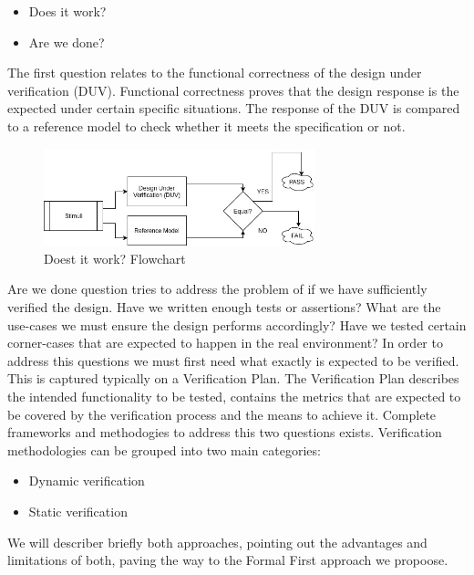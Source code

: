 \documentclass[a4paper,11pt]{article}
\begin{document}
\begin{itemize}
\item Does it work?
\item Are we done?
\end{itemize}
The first question relates to the functional correctness of the design under verification (DUV). Functional correctness proves that the design response is the expected under certain specific situations. The response of the DUV is compared to a reference model to check whether it meets the specification or not. 
\begin{figure}[h]
\centering
\includegraphics[width=0.7\textwidth]{doesitwork.jpg}
\caption{Doest it work? Flowchart}
\end{figure} 
Are we done question tries to address the problem of if we have sufficiently verified the design. Have we written enough tests or assertions? What are the use-cases we must ensure the design performs accordingly? Have we tested certain corner-cases that are expected to happen in the real environment? In order to address this questions we must first need what exactly is expected to be verified. 
This is captured typically on a Verification Plan. The Verification Plan describes the intended functionality to be tested, contains the metrics that are expected to be covered by the verification process and the means to achieve it. 
Complete frameworks and methodogies to address this two questions exists. 
Verification methodologies can be grouped into two main categories:
\begin{itemize}
\item Dynamic verification
\item Static  verification
\end{itemize}
We will describer briefly both approaches, pointing out the advantages and limitations of both, paving the way to the Formal First approach we propoose. 
\end{document}
